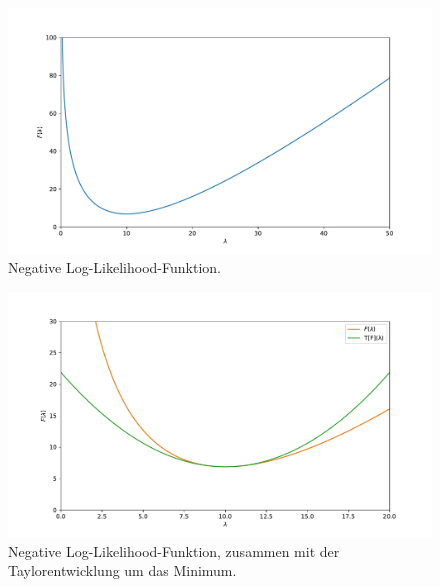 \documentclass[a4paper, 11pt]{article}
\begin{document}

\FloatBarrier
\begin{figure}
    \centering
    \includegraphics[width=\textwidth]{../A29/A29a.pdf}
    \caption{Negative Log-Likelihood-Funktion.}
\end{figure}
\begin{figure}
    \centering
    \includegraphics[width=\textwidth]{../A29/A29d.pdf}
    \caption{Negative Log-Likelihood-Funktion, zusammen mit der Taylorentwicklung um das Minimum.}
\end{figure}
\FloatBarrier


\end{document}
